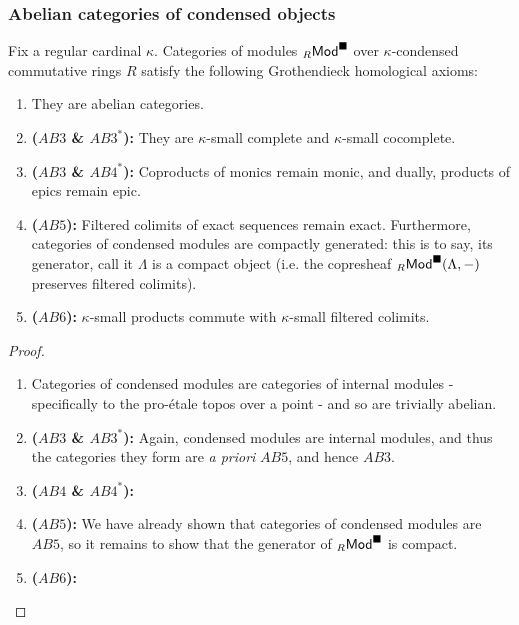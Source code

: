             \subsubsection{Abelian categories of condensed objects}
                \begin{theorem} \label{theorem: abelian_categories_of_condensed_modules}
                    Fix a regular cardinal $\kappa$. Categories of modules ${}_R\mathsf{Mod}^{\blacksquare}$ over $\kappa$-condensed commutative rings $R$ satisfy the following Grothendieck homological axioms:
                        \begin{enumerate}
                            \item They are abelian categories.
                            \item \textbf{($AB3$ \& $AB3^*$):} They are $\kappa$-small complete and $\kappa$-small cocomplete.
                            \item \textbf{($AB3$ \& $AB4^*$):} Coproducts of monics remain monic, and dually, products of epics remain epic.
                            \item \textbf{($AB5$):} Filtered colimits of exact sequences remain exact. Furthermore, categories of condensed modules are compactly generated: this is to say, its generator, call it $\Lambda$ is a compact object (i.e. the copresheaf ${}_R\mathsf{Mod}^{\blacksquare}(\Lambda, -)$ preserves filtered colimits).
                            \item \textbf{($AB6$):} $\kappa$-small products commute with $\kappa$-small filtered colimits.
                        \end{enumerate}
                \end{theorem}
                    \begin{proof}
                        \noindent
                        \begin{enumerate}
                            \item Categories of condensed modules are categories of internal modules - specifically to the pro-\'etale topos over a point - and so are trivially abelian. 
                            \item \textbf{($AB3$ \& $AB3^*$):} Again, condensed modules are internal modules, and thus the categories they form are \textit{a priori} $AB5$, and hence $AB3$.
                            \item \textbf{($AB4$ \& $AB4^*$):} 
                            \item \textbf{($AB5$):} We have already shown that categories of condensed modules are $AB5$, so it remains to show that the generator of ${}_R\mathsf{Mod}^{\blacksquare}$ is compact.
                            \item \textbf{($AB6$):} 
                        \end{enumerate}
                    \end{proof}
